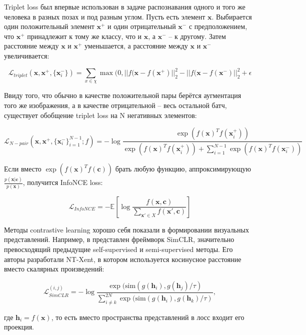 \documentclass[a4paper, 14pt]{article}
\begin{document}
Triplet loss был впервые использован в задаче распознавания одного и того же человека в разных позах и под разным углом. Пусть есть элемент $\mathbf{x}$. Выбирается один положительный элемент $\textbf{x}^+$ и один отрицательный $\textbf{x}^-$ с предположением, что $\textbf{x}^+$ принадлежит к тому же классу, что и $\mathbf{x}$, а $\mathbf{x}^-$ -- к другому. Затем расстояние между $\mathbf{x}$ и $\mathbf{x}^+$ уменьшается, а расстояние между $\mathbf{x}$ и $\mathbf{x}^-$ увеличивается:

\begin{equation}
    \mathcal{L}_{triplet}(\textbf{x}, \textbf{x}^+, \{\textbf{x}_i^-\}) = \sum\limits_{x \in \chi}\max(0, ||f(\textbf{x} - f(\textbf{x}^+)||_2^2 - ||f(\textbf{x} - f(\textbf{x}^-)||_2^2 + \epsilon
\end{equation}

Ввиду того, что обычно в качестве положительной пары берётся аугментация того же изображения, а в качестве отрицательной -- весь остальной батч, существует обобщение triplet loss на N негативных элементов:

\begin{equation}\label{eq:103}
    \mathcal{L}_{N-pair}(\textbf{x}, \textbf{x}^+, \{\textbf{x}_i^-\}_{i=1}^{N-1}; f) = - \log \frac{\exp(f(\textbf{x})^T f(\textbf{x}_i^+))}{\exp(f(\textbf{x})^T f(\textbf{x}_i^+)) + \sum _{i=1}^{N-1} \exp(f(\textbf{x})^Tf(\textbf{x}_i^-))}
\end{equation}

Если вместо $\exp(f(\textbf{x})^T f(\textbf{c}))$ брать любую функцию, аппроксимирующую $\frac{p(\textbf{x}|\textbf{c})}{p(\textbf{x})}$, получится InfoNCE loss:

\[\mathcal{L}_{InfoNCE} = -\mathbb{E}\left[\log\frac{f(\textbf{x}, \textbf{c})}{\sum_{\mathbf{x}' \in X}f(\textbf{x}', \textbf{c})}\right]\]

Методы contrastive learning хорошо себя показали в формировании визуальных представлений. Например, в \citep{chen2020simple} представлен фреймворк SimCLR, значительно превосходящий предыдущие self-supervised и semi-supervised методы. Его авторы разработали NT-Xent, в котором используется косинусное расстояние вместо скалярных произведений:

\[\mathcal{L}_{SimCLR}^{(i, j)} = - \log\frac{\exp(\text{sim}(g(\mathbf{h}_i), g(\mathbf{h}_j) / \tau)}{\sum\limits_{i \neq k}^{2N}\exp(\text{sim}(g(\mathbf{h}_i), g(\mathbf{h}_k) / \tau)},\]

\noindent где $\mathbf{h}_i = f(\mathbf{x})$, то есть вместо пространства представлений в лосс входит его проекция.
\end{document}
